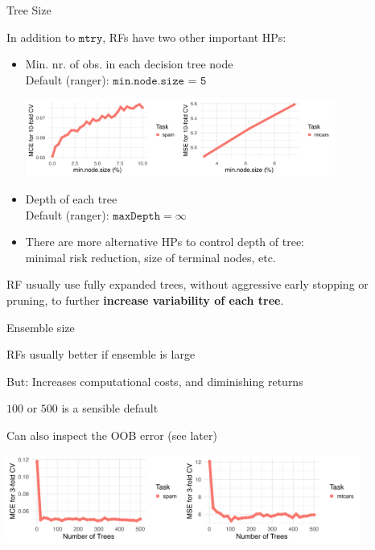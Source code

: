 \documentclass[11pt,compress,t,notes=noshow, xcolor=table]{beamer}
\begin{document}
\begin{frame2}{Tree Size}

In addition to $\texttt{mtry}$, RFs have two other important HPs:

\begin{itemize}
  \item Min. nr. of obs. in each decision tree node \\
    Default (ranger): $\texttt{min.node.size = 5}$ 
\begin{center}
\includegraphics[width=0.8\textwidth]{figure/forest-minnode.png}
\end{center}
  \item Depth of each tree \\
    Default (ranger): $\texttt{maxDepth} = \infty$
  \item There are more alternative HPs to control depth of tree:\\
    minimal risk reduction, size of terminal nodes, etc.
\end{itemize}

\lz

RF usually use fully expanded trees, without aggressive early stopping or pruning, to further \textbf{increase variability of each tree}. 
\end{frame2}

\begin{framei}{Ensemble size}
\item RFs usually better if ensemble is large 
\item But: Increases computational costs, and diminishing returns
\item $100$ or $500$ is a sensible default
\item Can also inspect the OOB error (see later)

\vfill


\begin{center}
\includegraphics[width=330pt]{figure/forest-ntree.png}
\end{center}
\end{framei}
\end{document}
